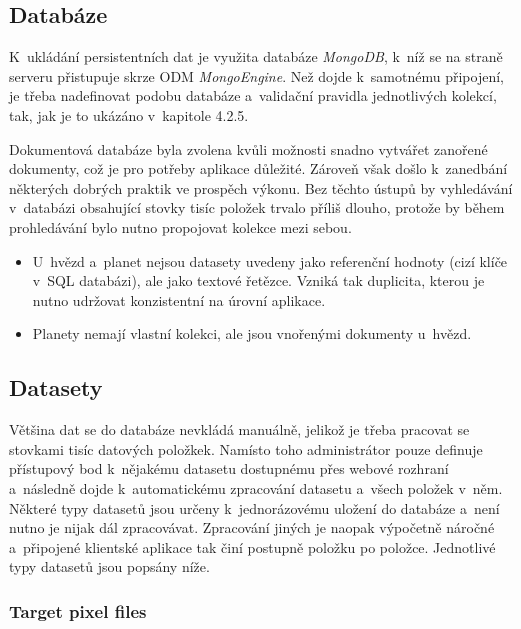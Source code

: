 \documentclass[a4paper,12pt]{article}
\begin{document}
{{{{{{{{


\subsection{Databáze}

K~ukládání persistentních dat je využita databáze \textit{MongoDB}, k~níž se na straně serveru přistupuje skrze ODM \textit{MongoEngine}. Než dojde k~samotnému připojení, je třeba nadefinovat podobu databáze a~validační pravidla jednotlivých kolekcí, tak, jak je to ukázáno v~kapitole 4.2.5.



Dokumentová databáze byla zvolena kvůli možnosti snadno vytvářet zanořené dokumenty, což je pro potřeby aplikace důležité. Zároveň však došlo k~zanedbání některých dobrých praktik ve prospěch výkonu. Bez těchto ústupů by vyhledávání v~databázi obsahující stovky tisíc položek trvalo příliš dlouho, protože by během prohledávání bylo nutno propojovat kolekce mezi sebou.

\begin{itemize}
	\item U~hvězd a~planet nejsou datasety uvedeny jako referenční hodnoty (cizí klíče v~SQL databázi), ale jako textové řetězce. Vzniká tak duplicita, kterou je nutno udržovat konzistentní na úrovní aplikace.
	\item Planety nemají vlastní kolekci, ale jsou vnořenými dokumenty u~hvězd.
\end{itemize}

\subsection{Datasety}

Většina dat se do databáze nevkládá manuálně, jelikož je třeba pracovat se stovkami tisíc datových položkek. Namísto toho administrátor pouze definuje přístupový bod k~nějakému datasetu dostupnému přes webové rozhraní a~následně dojde k~automatickému zpracování datasetu a~všech položek v~něm. Některé typy datasetů jsou určeny k~jednorázovému uložení do databáze a~není nutno je nijak dál zpracovávat. Zpracování jiných je naopak výpočetně náročné a~připojené klientské aplikace tak činí postupně položku po položce. Jednotlivé typy datasetů jsou popsány níže.

\subsubsection{Target pixel files}

}}}}}}}}
\end{document}
